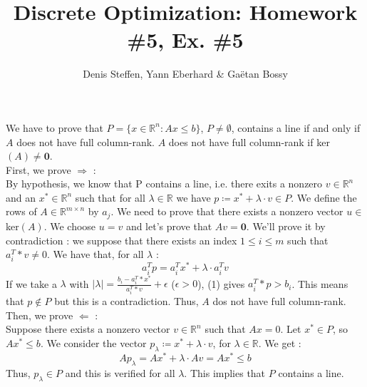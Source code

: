 \documentclass[a4paper,11pt,french]{article}
\title{Discrete Optimization: Homework \#5, Ex. \#5}
\author{Denis Steffen, Yann Eberhard \& Gaëtan Bossy}
\begin{document}
    
    \maketitle
    
    We have to prove that $P = \{ x \in \mathbb{R}^n : Ax \leq b\}$, $P \not = \emptyset $, contains a line if and only if $A$ does not have full column-rank.
    $A$ does not have full column-rank if ker$(A) \not = \mathbf {0}$. 
\\

    First, we prove  $\Rightarrow$ : \\
    By hypothesis, we know that P contains a line, i.e. there exits a nonzero $v \in \mathbb{R}^n$ and an $x^* \in \mathbb{R}^n$ such that for all $\lambda \in \mathbb{R}$ we have $ p \coloneqq x^* + \lambda \cdot v \in P$. 
    We define the rows of $A \in \mathbb{R}^{m \times n}$ by $a_j$.
    We need to prove that there exists a nonzero vector $u \in$ ker$(A)$. We choose $u = v$ and let's prove that $Av = \mathbf 0$.  
    We'll prove it by contradiction : we suppose that there exists an index $1 \leq i \leq m$ such that $a_i^T*v \not = 0$. We have that, for all $\lambda$ : 
    \begin{equation}
        a_i^Tp = a_i^Tx^* + \lambda \cdot a_i^Tv
    \end{equation}
    If we take a $\lambda$ with $\left| \lambda \right| = \frac{ b_i - a_i^T*x^*}{a_i^T*v} + \epsilon$ ($\epsilon > 0$), (1) gives $a_i^T*p > b_i$. 
    This means that $p \not \in P$ but this is a contradiction. Thus, $A$ dos not have full column-rank.
    \\

    Then, we prove $\Leftarrow$ : 
    \\ Suppose there exists a nonzero vector $v \in \mathbb{R}^n$ such that $Ax = 0$. 
    Let $x^* \in P$, so $Ax^* \leq b$. We consider the vector $p_\lambda \coloneqq x^* + \lambda \cdot v$, for $\lambda \in \mathbb{R}$. 
    We get : 
    \begin{equation*}
        Ap_\lambda = Ax^* + \lambda \cdot Av = Ax^* \leq b
    \end{equation*}
    Thus, $p_\lambda \in P$ and this is verified for all $\lambda$. This implies that $P$ contains a line.

    
    
\end{document}
